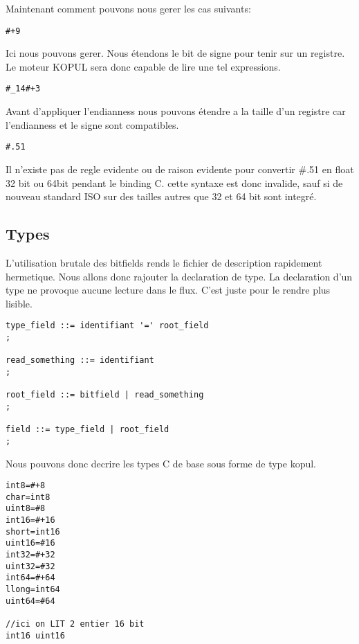 \documentclass[11pt]{report}
\begin{document}
Maintenant comment pouvons nous gerer les cas suivants:

\begin{lstlisting}
#+9
\end{lstlisting}

Ici nous pouvons gerer. Nous étendons le bit de signe pour tenir sur un registre.
Le moteur KOPUL sera donc capable de lire une tel expressions.

\begin{lstlisting}
#_14#+3
\end{lstlisting}

Avant d'appliquer l'endianness nous pouvons étendre a la taille d'un registre car l'endianness et le signe 
sont compatibles.

\begin{lstlisting}
#.51
\end{lstlisting}

Il n'existe pas de regle evidente ou de raison evidente pour convertir \#.51 en float
32 bit ou 64bit pendant le binding C. cette syntaxe est donc invalide, sauf si de nouveau standard ISO
 sur des tailles autres que 32 et 64 bit sont integré.

\subsection{Types}

L'utilisation brutale des bitfields rends le fichier de description rapidement hermetique. 
Nous allons donc rajouter la declaration de type.
La declaration d'un type ne provoque aucune lecture dans le flux. 
C'est juste pour le rendre plus lisible.

\begin{lstlisting}
type_field ::= identifiant '=' root_field
;

read_something ::= identifiant
;

root_field ::= bitfield | read_something
;

field ::= type_field | root_field
;
\end{lstlisting}

Nous pouvons donc decrire les types C de base sous forme de type kopul.

\begin{lstlisting}
int8=#+8
char=int8
uint8=#8
int16=#+16
short=int16
uint16=#16
int32=#+32
uint32=#32
int64=#+64
llong=int64
uint64=#64

//ici on LIT 2 entier 16 bit
int16 uint16
\end{lstlisting}
\end{document}
